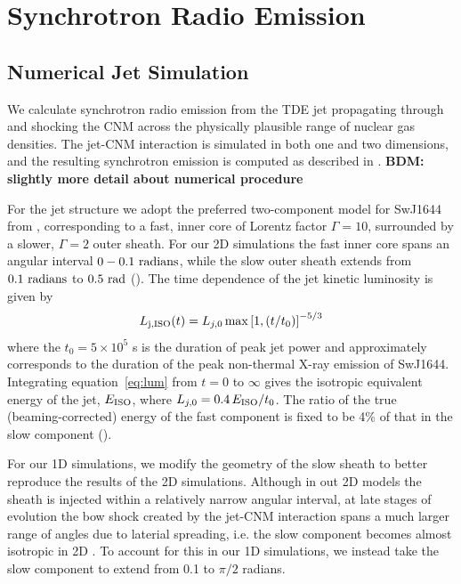 \documentclass[usenatbib,fleqn]{mnras}
\begin{document}
\section{Synchrotron Radio Emission}

\label{sec:results}
\subsection{Numerical Jet Simulation}
\label{sec:numerical}
We calculate synchrotron radio emission from the TDE jet propagating
through and shocking the CNM across the physically plausible range of
nuclear gas densities.  The jet-CNM interaction is simulated in both
one and two dimensions, and the resulting synchrotron emission is
computed as described in \citet{Mimica+2015}.  {\bf BDM: slightly more
  detail about numerical procedure}

For the jet structure we adopt the preferred two-component model for
SwJ1644 from \citet{Mimica+2015}, corresponding to a fast, inner core
of Lorentz factor $\Gamma = 10$, surrounded by a slower, $\Gamma=2$
outer sheath.  For our 2D simulations the fast inner core spans an
angular interval $0-0.1\ {\rm radians}$, while the slow outer sheath
extends from $0.1\ {\rm radians}$ to $0.5\ {\rm rad}$
(\citealt{Mimica+2015}).  The time dependence of the jet kinetic
luminosity is given by
\begin{equation}\label{eq:lum}
L_{\rm j, ISO}(t) = L_{j,0}\max\left[1, (t/t_0)\right]^{-5/3}
\end{equation}
%
where the $t_0 = 5\times 10^5$ s is the duration of peak jet power and
approximately corresponds to the duration of the peak non-thermal
X-ray emission of SwJ1644.  Integrating equation~\ref{eq:lum} from $t
= 0$ to $\infty$ gives the isotropic equivalent energy of the jet,
$E_{\rm ISO}$, where $L_{j,0}=0.4\, E_{\rm ISO}/t_0$.  The ratio of
the true (beaming-corrected) energy of the fast component is fixed to
be 4\% of that in the slow component (\citealt{Mimica+2015}).

For our 1D simulations, we modify the geometry of the slow sheath to
better reproduce the results of the 2D simulations.  Although in out
2D models the sheath is injected within a relatively narrow angular
interval, at late stages of evolution the bow shock created by the
jet-CNM interaction spans a much larger range of angles due to
laterial spreading, i.e. the slow component becomes almost isotropic
in 2D \citep[bottom two panels of Fig.~8 in][]{Mimica+2015}. To
account for this in our 1D simulations, we instead take the slow
component to extend from 0.1 to $\pi/2$ radians.
\end{document}
